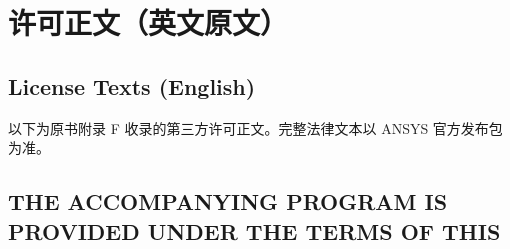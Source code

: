 \section{许可正文（英文原文）}
\subsection*{License Texts (English)}

\begin{noteBox}
以下为原书附录 F 收录的第三方许可正文。完整法律文本以 ANSYS 官方发布包为准。
\end{noteBox}

\subsection{THE ACCOMPANYING PROGRAM IS PROVIDED UNDER THE TERMS OF THIS}

